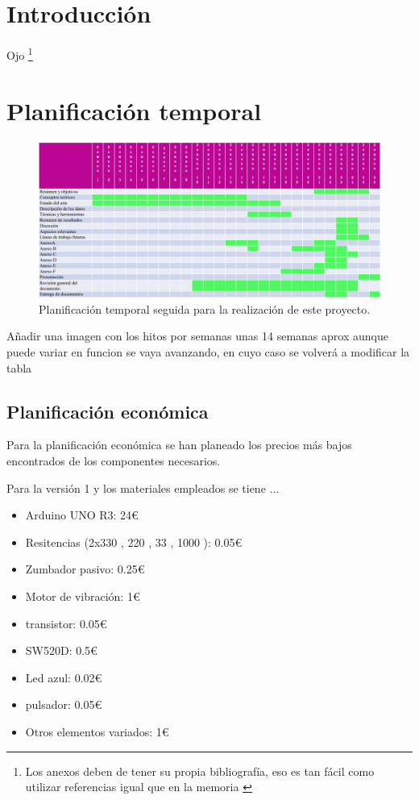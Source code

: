 
\section{Introducción}

Ojo \footnote{Los anexos deben de tener su propia bibliografía, eso es tan fácil como utilizar referencias igual que en la memoria \cite{bortolot2005}}

\section{Planificación temporal}
\begin{figure}[h]
    \centering
    \includegraphics[width=1\textwidth]{img/PlanificacionTemporal.png}
    \caption{Planificación temporal seguida para la realización de este proyecto.}
    \label{fig:planTemporal} %
\end{figure}
Añadir una imagen con los hitos por semanas unas 14 semanas aprox aunque puede variar en funcion se vaya avanzando, en cuyo caso se volverá a modificar la tabla

\subsection{Planificación económica}
Para la planificación económica se han planeado los precios más bajos encontrados de los componentes necesarios.

Para la versión 1 y los materiales empleados se tiene ...
\begin{itemize}
    \item Arduino UNO R3: 24€
    \item Resitencias (2x330 \textOmega, 220 \textOmega, 33 \textOmega, 1000 \textOmega): 0.05€
    \item Zumbador pasivo: 0.25€
    \item Motor de vibración: 1€
    \item transistor: 0.05€
    \item SW520D: 0.5€
    \item Led azul: 0.02€
    \item pulsador: 0.05€
    \item Otros elementos variados: 1€
    
\end{itemize}

